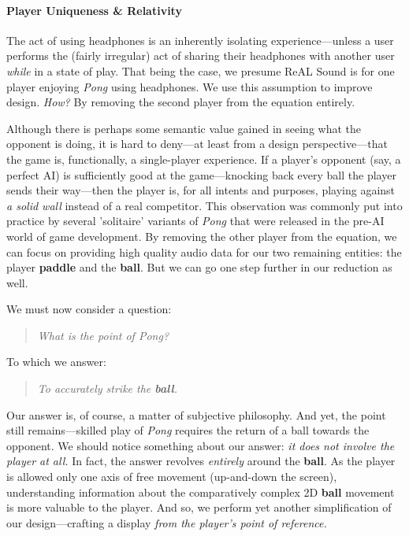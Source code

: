 \documentclass{report}
\newcommand{\rs}{ReAL Sound\xspace}
\newcommand{\pad}{\textbf{paddle}\xspace}
\newcommand{\ball}{\textbf{ball}\xspace}
\begin{document}
\paragraph{Player Uniqueness \& Relativity}
The act of using headphones is an inherently isolating experience---unless a user performs the (fairly irregular) act of sharing their headphones with another user \emph{while} in a state of play. That being the case, we presume \rs is for one player enjoying \emph{Pong} using headphones. We use this assumption to improve design. \emph{How?} By removing the second player from the equation entirely. 

Although there is perhaps some semantic value gained in seeing what the opponent is doing, it is hard to deny---at least from a design perspective---that the game is, functionally, a single-player experience. If a player's opponent (say, a perfect AI) is sufficiently good at the game---knocking back every ball the player sends their way---then the player is, for all intents and purposes, playing against \emph{a solid wall} instead of a real competitor. This observation was commonly put into practice by several 'solitaire' variants of \emph{Pong} that were released in the pre-AI world of game development. By removing the other player from the equation, we can focus on providing high quality audio data for our two remaining entities: the player \pad and the \ball. But we can go one step further in our reduction as well. 

We must now consider a question: 
\begin{quote}
\emph{What is the point of Pong?}     
\end{quote}

To which we answer:
\begin{quote}
\emph{To accurately strike the \ball.}
\end{quote}

Our answer is, of course, a matter of subjective philosophy. And yet, the point still remains---skilled play of \emph{Pong} requires the return of a ball towards the opponent. We should notice something about our answer: \emph{it does not involve the player at all.} In fact, the answer revolves \emph{entirely} around the \ball. As the player is allowed only one axis of free movement (up-and-down the screen), understanding information about the comparatively complex 2D \ball movement is more valuable to the player. And so, we perform yet another simplification of our design---crafting a display \emph{from the player's point of reference.} 
\end{document}
